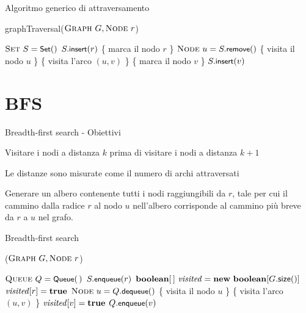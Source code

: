 \begin{frame}{Algoritmo generico di attraversamento}
	
\begin{Procedure}
\caption[A]{\textsf{graphTraversal}($\Graph\ G, \Node\ r$)}

$\textsc{Set}\ S = \textsf{{\small Set}}()$
$S.\textsf{{\small insert}}(r)$
\{ \alert{marca il nodo $r$} \} \;
{
  $\textsc{Node}\ u = S.\textsf{{\small remove}}()$
  \{ \alert{visita il nodo $u$} \}\;
  {
    \{ \alert{visita l'arco $(u,v)$} \}\;
    {
      \{ \alert{marca il nodo $v$} \} \;
      $S.\textsf{{\small insert}}(v)$
    }
  }
}
\end{Procedure}

\end{frame}

\section{BFS}

\begin{frame}{Breadth-first search - Obiettivi}

\BI
\item Visitare i nodi a distanza $k$ prima di visitare i nodi a distanza $k+1$ 
\EI

\medskip
{}
\BI
\item Le distanze sono misurate come il numero di archi attraversati
\EI

\medskip
{}
\BI
\item Generare un albero contenente tutti i nodi raggiungibili da $r$, tale per cui il cammino dalla radice $r$ al nodo $u$ nell'albero corrisponde al cammino più breve da $r$ a $u$ nel grafo.
\EI


\end{frame}

\begin{frame}[shrink=10]{Breadth-first search}

\vspace{-12pt}
\begin{Procedure}
\caption[A]{\bfsproc($\Graph\ G, \Node\ r$)}

$\textsc{Queue}\ Q = \textsf{{\small Queue}}(\,)$\;
$S.\textsf{{\small enqueue}}(r)$\;
$\BOOLEAN[\,]\ \mmark = \NEW\ \BOOLEAN[G.\textsf{size}()]$\;
$\mmark[r] = \TRUE$\;
{
  $\textsc{Node}\ u = Q.\textsf{{\small dequeue}}()$\;
  \{ \alert{visita il nodo $u$ }\}\;
  {
    \{ \alert{visita l'arco $(u,v)$} \}\;
    \If{\NOT $\mmark[v]$}
    {
      { $\mmark[v] = \TRUE$ } \;
      $Q.\textsf{{\small enqueue}}(v)$\;
    }
  }
}
\end{Procedure}

\end{frame}

